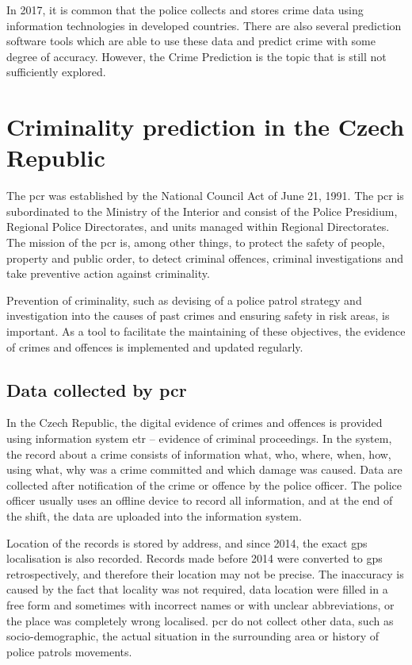 \documentclass[thesis=M,english]{FITthesis}[2012/10/20]
\begin{document}
In 2017, it is common that the police collects and stores crime data using information technologies in developed countries. There are also several prediction software tools which are able to use these data and predict crime with some degree of accuracy. However, the Crime Prediction is the topic that is still not sufficiently explored.\cite[5]{PP13}

\section{Criminality prediction in the Czech Republic}

The \gls{pcr} was established by the National Council Act of June 21, 1991. The \gls{pcr} is subordinated to the Ministry of the Interior and consist of the Police Presidium, Regional Police Directorates, and units managed within Regional Directorates. The mission of the \gls{pcr} is, among other things, to protect the safety of people, property and public order, to detect criminal offences, criminal investigations and take preventive action against criminality.\cite[95]{Hruska2015maps} 

Prevention of criminality, such as devising of a police patrol strategy and investigation into the causes of past crimes and ensuring safety in risk areas, is important. As a tool to facilitate the maintaining of these objectives, the evidence of crimes and offences is implemented and updated regularly. 

\subsection{Data collected by \gls{pcr}}
In the Czech Republic, the digital evidence of crimes and offences is provided using information system \gls{etr} -- evidence of criminal proceedings. In the system, the record about a crime consists of information what, who, where, when, how, using what, why was a crime committed and which damage was caused. Data are collected after notification of the crime or offence by the police officer. The police officer usually uses an offline device to record all information, and at the end of the shift, the data are uploaded into the information system.\cite[99]{Hruska2015maps}

Location of the records is stored by address, and since 2014, the exact \gls{gps} localisation is also recorded. Records made before 2014 were converted to \gls{gps} retrospectively, and therefore their location may not be precise. The inaccuracy is caused by the fact that locality was not required, data location were filled in a free form and sometimes with incorrect names or with unclear abbreviations, or the place was completely wrong localised. \cite[100]{Hruska2015maps} \gls{pcr} do not collect other data, such as socio-demographic, the actual situation in the surrounding area or history of police patrols movements.
\end{document}
